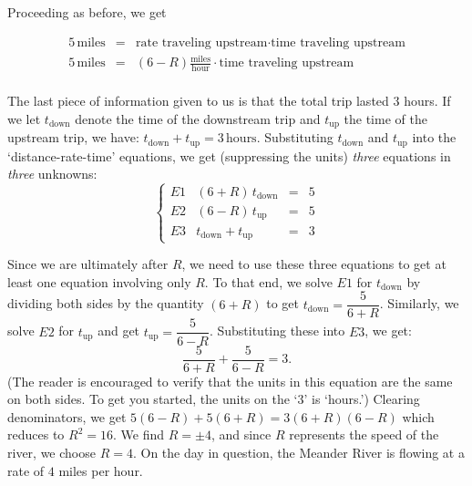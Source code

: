{Proceeding as before, we get
 
 \[ \begin{array}{rcl}

5 \, \text{miles} & = & \text{rate traveling upstream} \cdot \text{time traveling upstream} \\ 

5 \, \text{miles} & = & (6 - R) \frac{\text{miles}}{\text{hour}} \cdot \text{time traveling upstream} \\ 	\end{array} \]
 
The last piece of information given to us is that the total trip lasted $3$ hours.  If we let $t_{\text{down}}$ denote the time of the downstream trip and $t_{\text{up}}$ the time of the upstream trip, we have:    $t_{\text{down}} + t_{\text{up}} = 3 \, \text{hours}$.  Substituting $t_{\text{down}}$ and $t_{\text{up}}$ into the `distance-rate-time' equations, we get (suppressing the units) \textit{three} equations in \textit{three} unknowns:
 \[\left\{\begin{array}{lrcl}   E1 & (6+R) \, t_{\text{down}} & = & 5 \\ E2 & (6-R) \, t_{\text{up}} & = & 5 \\ E3 & t_{\text{down}} + t_{\text{up}} & = & 3 \end{array} \right.\]



Since we are ultimately after $R$, we need to use these three equations to get at least one equation involving only $R$.  To that end, we solve $E1$ for $t_{\text{down}}$ by dividing both sides by the quantity $(6+R)$ to get $t_{\text{down}} = \dfrac{5}{6+R}$.   Similarly, we solve $E2$ for $t_{\text{up}}$ and get $t_{\text{up}} = \dfrac{5}{6-R}$. Substituting these into $E3$, we get: \[\dfrac{5}{6+R} + \dfrac{5}{6 - R} = 3.\] 
(The reader is encouraged to verify that the units in this equation are the same on both sides.  To get you started, the units on the `3' is `hours.') Clearing denominators, we get $5(6-R) + 5(6+R) = 3(6+R)(6-R)$ which reduces to  $R^2 = 16$.   We find $R = \pm 4$, and since $R$ represents the speed of the river, we choose $R = 4$.   On the day in question, the Meander River is flowing at a rate of $4$ miles per hour. 


}

